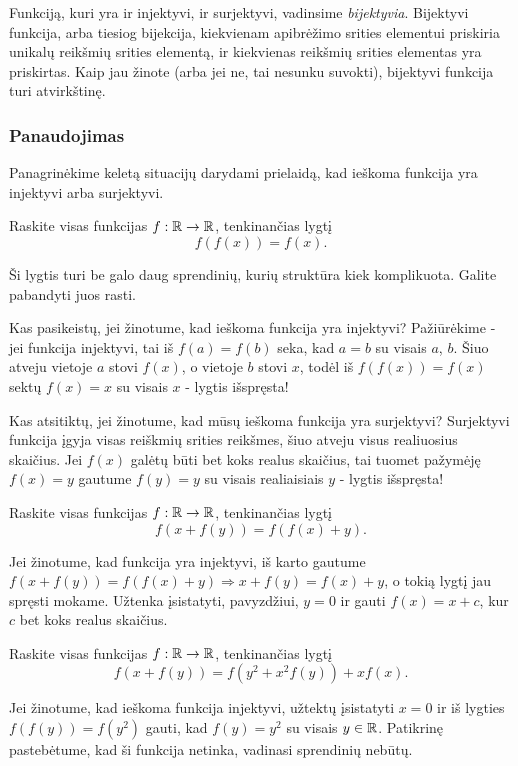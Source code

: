 Funkciją, kuri yra ir injektyvi, ir surjektyvi, vadinsime
\emph{bijektyvia}.  Bijektyvi funkcija, arba tiesiog bijekcija, kiekvienam
apibrėžimo srities elementui priskiria unikalų reikšmių srities elementą,
ir kiekvienas reikšmių srities elementas yra priskirtas. Kaip jau žinote
(arba jei ne, tai nesunku suvokti), bijektyvi funkcija turi atvirkštinę.

\subsubsection{Panaudojimas}

Panagrinėkime keletą situacijų darydami prielaidą, kad ieškoma funkcija yra
injektyvi arba surjektyvi.

\begin{pav}
Raskite visas funkcijas $f:\mathbb R \to \mathbb R$, tenkinančias lygtį $$f(f(x))=f(x).$$
\end{pav}

Ši lygtis turi be galo daug sprendinių, kurių struktūra kiek komplikuota.
Galite pabandyti juos rasti.

Kas pasikeistų, jei žinotume, kad ieškoma funkcija yra injektyvi?
Pažiūrėkime - jei funkcija injektyvi, tai iš $f(a)=f(b)$ seka, kad $a=b$ su
visais $a$, $b$. Šiuo atveju vietoje $a$ stovi $f(x)$, o vietoje $b$ stovi
$x$, todėl iš $f(f(x))=f(x)$ sektų $f(x)=x$ su visais $x$ - lygtis
išspręsta!

Kas atsitiktų, jei žinotume, kad mūsų ieškoma funkcija yra surjektyvi?
Surjektyvi funkcija įgyja visas reiškmių srities reikšmes, šiuo atveju
visus realiuosius skaičius. Jei $f(x)$ galėtų būti bet koks realus skaičius,
tai tuomet pažymėję $f(x)=y$ gautume $f(y)=y$ su visais realiaisiais $y$ -
lygtis išspręsta!

\begin{pav}
Raskite visas funkcijas $f:\mathbb R \to \mathbb R$, tenkinančias lygtį $$f(x+f(y)) =
f(f(x)+y).$$
\end{pav}

Jei žinotume, kad funkcija yra injektyvi, iš karto gautume $f(x+f(y)) =
f(f(x)+y) \Rightarrow x+f(y) = f(x)+y$, o tokią lygtį jau spręsti mokame.
Užtenka įsistatyti, pavyzdžiui, $y=0$ ir gauti $f(x)=x+c$, kur $c$ bet koks
realus skaičius.

\begin{pav}
Raskite visas funkcijas $f:\mathbb R \to \mathbb R$, tenkinančias lygtį $$f(x+f(y)) =
f(y^2 + x^2f(y)) + xf(x).$$
\end{pav}

Jei žinotume, kad ieškoma funkcija injektyvi, užtektų įsistatyti $x = 0$ ir
iš lygties $f(f(y))=f(y^2)$ gauti, kad $f(y)=y^2$ su visais $y \in \mathbb R$.
Patikrinę pastebėtume, kad ši funkcija netinka, vadinasi sprendinių nebūtų.

